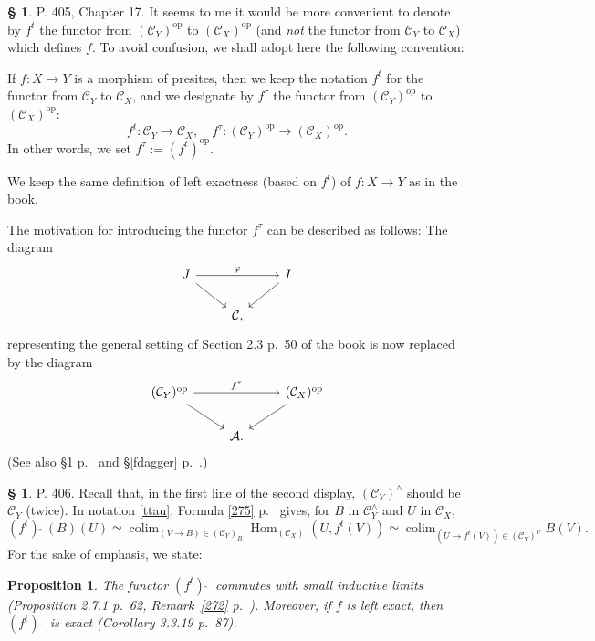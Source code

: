 \documentclass[12pt]{article}%
\newtheorem{prop}[thm]{Proposition}
\theoremstyle{remark}
\theoremstyle{definition}
\newtheorem{s}[thm]{\S}%
\newcommand{\A}{\mathcal A}
\newcommand{\C}{\mathcal C}
\newcommand{\pp}{\varphi}
\DeclareMathOperator*{\colim}{colim}
\DeclareMathOperator{\Hom}{Hom}%
\DeclareMathOperator{\op}{op}
\begin{document}
\begin{s}
P. 405, Chapter 17. It seems to me it would be more convenient to denote by $f^t$ the functor from $(\C_Y)^{\op}$ to $(\C_X)^{\op}$ (and {\em not} the functor from $\C_Y$ to $\C_X$) which defines $f$. To avoid confusion, we shall adopt here the following convention:

If $f:X\to Y$ is a morphism of presites,  then we keep the notation $f^t$ for the functor from $\C_Y$ to $\C_X$, and we designate by $f^\tau$  the functor from $(\C_Y)^{\op}$ to $(\C_X)^{\op}$:
\begin{equation}\label{ttau}
f^t:\C_Y\to\C_X,\quad f^\tau:(\C_Y)^{\op}\to(\C_X)^{\op}.
\end{equation}
In other words, we set $f^\tau:=(f^t)^{\op}$. 

We keep the same definition of left exactness (based on $f^t$) of $f:X\to Y$ as in the book.

The motivation for introducing the functor $f^\tau$ can be described as follows: The diagram 
$$
\begin{tikzcd}
J\ar{dr}\ar{rr}{\pp}&&I\ar{dl}\\ 
{}&\C,
\end{tikzcd}
$$ 
representing the general setting of Section 2.3 p.~50 of the book is now replaced by the diagram 
$$
\begin{tikzcd}
(\C_Y)^{\op}\ar{dr}\ar{rr}{f^\tau}&&(\C_X)^{\op}\ar{dl}\\ 
{}&\A.
\end{tikzcd}
$$ 
(See also \S\ref{fhat} p.~\pageref{fhat} and \S\ref{fdagger} p.~\pageref{fdagger}.)
\end{s}

%

\begin{s}\label{fhat}
P. 406. Recall that, in the first line of the second display, $(\C_Y)^\wedge$ should be $\C_Y$ (twice). In notation \eqref{ttau}, Formula \eqref{275} p.~\pageref{275} gives, for $B$ in $\C_Y^\wedge$ and $U$ in $\C_X$, 
$$
(f^t)\ \widehat{}\ (B)(U)\simeq\colim_{(V\to B)\in(\C_Y)_B}\Hom_{(\C_X)}(U,f^t(V))\simeq\colim_{(U\to f^t(V))\in(\C_Y)^U}B(V).
$$
%
%
For the sake of emphasis, we state: 

\begin{prop}\label{p406}
The functor $(f^t)\ \widehat{}\ $ commutes with small inductive limits (Proposition 2.7.1 p.~62, Remark~\ref{272} p.~\pageref{272}). Moreover, if $f$ is left exact, then $(f^t)\ \widehat{}\ $ is exact (Corollary 3.3.19 p.~87).
\end{prop}
\end{s}
\end{document}
